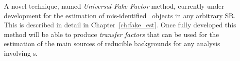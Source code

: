 A novel technique, named \textit{Universal Fake Factor} method, currently under development for the estimation of mis-identified \htau\ objects in any arbitrary \ac{SR}. This is described in detail in Chapter~\ref{ch:fake_est}. 
Once fully developed this method will be able to produce \textit{transfer factors} that can be used for the estimation of the main sources of reducible backgrounds for any analysis involving \ltau s. 



